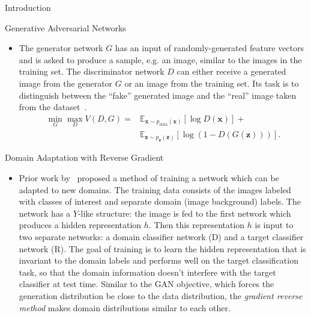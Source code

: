 \documentclass[final]{beamer}
\newlength{\onecolwid}
\begin{document}
\begin{frame}[t]
\begin{columns}[t]
\begin{column}{\onecolwid}
\begin{block}{Introduction}
\end{block}



\begin{block}{Generative Adversarial Networks}
    \begin{itemize}
        \item The generator network $G$ has an
    input of randomly-generated feature vectors and is asked to produce a sample, e.g. an image, 
    similar to the images in the training set. The discriminator network $D$
    can either receive a generated image from the generator $G$ or an image
    from the training set. Its task is to distinguish
    between the ``fake'' generated image and the ``real'' image taken from the dataset~\cite{goodfellow2014generative}. 
    \begin{align*}
        \min_G \max_D V(D, G) =& \mathbb{E}_{\bm{x} \sim p_{\text{data}}(\bm{x})}[\log D(\bm{x})] + \\
            &\mathbb{E}_{\bm{z} \sim p_{\bm{z}}(\bm{z})}[\log (1 - D(G(\bm{z})))].
    \end{align*}

    \end{itemize}


    \begin{block}{Domain Adaptation with Reverse Gradient}
        \begin{itemize}
    \item 
    Prior work by~\cite{ganin2014unsupervised} proposed a method of training a network 
    which can be adapted to new domains. The training data consists of the images
    labeled with classes of interest and separate domain (image background) labels. 
    The network has a $Y$-like structure: the image is fed to the
    first network which produces a hidden representation $h$. Then this representation $h$ is input to two separate networks: a domain classifier network (D) and 
    a target classifier network (R). The goal of training is to learn the hidden 
    representation that is invariant to the domain labels and performs well on the target classification task, so that the domain information doesn't 
    interfere with the target classifier at test time. Similar to the GAN objective, which forces the generation distribution be close to the data distribution,
    the \emph{gradient reverse method} makes domain distributions similar to each other.



\end{itemize}
\end{block}
\end{block}
\end{column}
\end{columns}
\end{frame}
\end{document}
